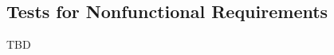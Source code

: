 \documentclass[10pt,titlepage]{article}
\begin{document}
					
					
					


					

					
					
					



    



\subsection{Tests for Nonfunctional Requirements}

TBD



		
\end{document}
